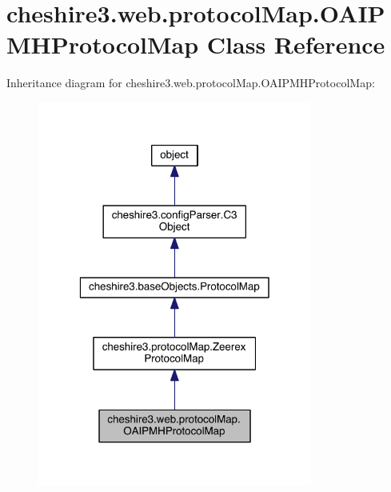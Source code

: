 \hypertarget{classcheshire3_1_1web_1_1protocol_map_1_1_o_a_i_p_m_h_protocol_map}{\section{cheshire3.\-web.\-protocol\-Map.\-O\-A\-I\-P\-M\-H\-Protocol\-Map Class Reference}
\label{classcheshire3_1_1web_1_1protocol_map_1_1_o_a_i_p_m_h_protocol_map}
}


Inheritance diagram for cheshire3.\-web.\-protocol\-Map.\-O\-A\-I\-P\-M\-H\-Protocol\-Map\-:
\nopagebreak
\begin{figure}[H]
\begin{center}
\leavevmode
\includegraphics[width=256pt]{classcheshire3_1_1web_1_1protocol_map_1_1_o_a_i_p_m_h_protocol_map__inherit__graph}
\end{center}
\end{figure}


